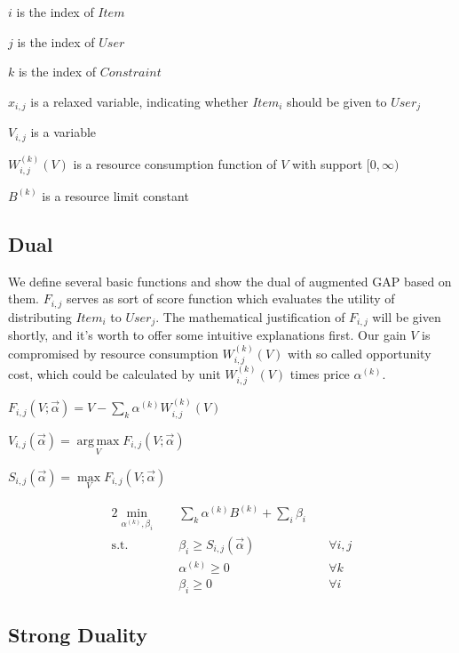 \documentclass[sigconf]{acmart}
\DeclareMathOperator*{\argmax}{arg\,max}
\newcommand{\sumi}{\sum\limits_i}
\newcommand{\sumk}{\sum\limits_k}
\newcommand{\sx}{x_{i,j}}
\newcommand{\sV}{V_{i,j}}
\newcommand{\sW}{W_{i,j}^{(k)}}
\newcommand{\sB}{B^{(k)}}
\newcommand{\salpha}{\alpha^{(k)}}
\newcommand{\sbeta}{\beta_i}
\newcommand{\sF}{F_{i,j}}
\newcommand{\sS}{S_{i,j}}
\newcommand{\valpha}{\vec{\alpha}}
\newcommand{\scoreconstraint}{\sbeta \ge \sS(\vec{\alpha})}
\begin{document}
$i$ is the index of $Item$

$j$ is the index of $User$

$k$ is the index of $Constraint$

$\sx$ is a relaxed variable, indicating whether $Item_i$ should be given to $User_j$

$\sV$ is a variable

$\sW(V)$ is a resource consumption function of $V$ with support $[0, \infty)$

$\sB$ is a resource limit constant

\subsection{Dual}

We define several basic functions and show the dual of augmented GAP based on them.
$\sF$ serves as sort of score function which evaluates the utility of distributing $Item_i$ to $User_j$.
The mathematical justification of $\sF$ will be given shortly, and it's worth to offer some intuitive explanations first.
Our gain $V$ is compromised by resource consumption $\sW(V)$ with so called opportunity cost, which could be calculated by unit $\sW(V)$ times price $\salpha$.

\begin{definition}
$\sF(V; \valpha) = V - \sumk \salpha \sW(V)$
\end{definition}

\begin{definition}
$\sV(\valpha) = \argmax\limits_V \sF(V; \valpha)$
\end{definition}

\begin{definition}
$\sS(\valpha) = \max\limits_V \sF(V; \valpha)$
\end{definition}

\begin{alignat}{2}
    \min\limits_{\salpha, \sbeta} \quad & \sumk \salpha \sB + \sumi \sbeta \quad   & {} \\
    \mbox{s.t.} \quad                   & \scoreconstraint \quad                   & \forall i,j \\
    \quad                               & \salpha \ge 0 \quad                      & \forall k \\
    \quad                               & \sbeta \ge 0 \quad                       & \forall i
\end{alignat}

\subsection{Strong Duality}
\end{document}
